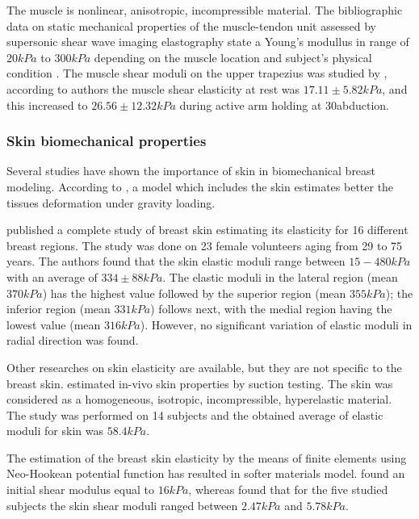The muscle is nonlinear, anisotropic, incompressible material.  The bibliographic data on static mechanical properties of the muscle-tendon unit assessed by supersonic shear wave imaging elastography state a Young's modullus in range of $20kPa$ to $300kPa$ depending on the muscle location and subject's physical condition \citep{lima_eassessment_2018}.  The muscle shear moduli on the upper trapezius was studied by \cite{leong_quantitative_2013}, according to authors the muscle shear elasticity at rest was $17.11\pm 5.82 kPa$, and this increased to $26.56\pm 12.32 kPa$ during active arm holding at 30\textdegree  abduction. 

\subsubsection*{Skin biomechanical properties}
Several studies have shown the importance of skin in biomechanical breast modeling. According to \cite{carter_biomechanical_2009}, a model which includes the skin estimates better the tissues deformation under gravity loading.

 \cite{sutradhar_vivo_2013} published a complete study of breast skin estimating its elasticity for 16 different breast regions. The study was done on 23 female volunteers aging from 29 to 75 years. The authors found that the skin elastic moduli range between $15-480 kPa$ with an average of $334\pm 88 kPa$. The elastic moduli in the lateral region (mean $370 kPa$) has the highest value followed by the superior region (mean $355 kPa$); the inferior region (mean $331 kPa$) follows next, with the medial region having the
lowest value (mean $316 kPa$). However, no significant variation of elastic moduli in radial direction was found. 
 
Other researches on skin elasticity are available, but they are not specific to the breast skin. \cite{hendriks_relative_2006} estimated in-vivo skin properties by suction testing. The skin was considered as a homogeneous, isotropic, incompressible, hyperelastic material. The study was performed on 14 subjects and the obtained average of elastic moduli for skin was $58.4 kPa$.

The estimation of the breast skin elasticity by the means of finite elements using Neo-Hookean potential function has resulted in softer materials model. \cite{carter_determining_2009} found an initial shear modulus equal to $16kPa$, whereas \cite{han_nonlinear_2014} found that for the five studied subjects the skin shear moduli ranged between $2.47 kPa$ and $5.78kPa$. 


